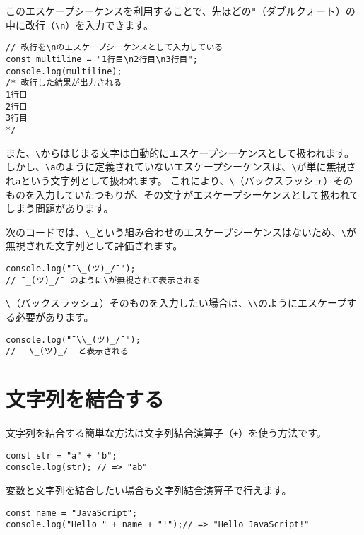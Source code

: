 このエスケープシーケンスを利用することで、先ほどの\texttt{"}（ダブルクォート）の中に改行（\texttt{\textbackslash n}）を入力できます。

\begin{lstlisting}
// 改行を\nのエスケープシーケンスとして入力している
const multiline = "1行目\n2行目\n3行目";
console.log(multiline); 
/* 改行した結果が出力される
1行目
2行目
3行目
*/
\end{lstlisting}

また、\texttt{\textbackslash}からはじまる文字は自動的にエスケープシーケンスとして扱われます。
しかし、\texttt{\textbackslash a}のように定義されていないエスケープシーケンスは、\texttt{\textbackslash}が単に無視され\texttt{a}という文字列として扱われます。
これにより、\texttt{\textbackslash}（バックスラッシュ）そのものを入力していたつもりが、その文字がエスケープシーケンスとして扱われてしまう問題があります。

次のコードでは、\texttt{\textbackslash\_}という組み合わせのエスケープシーケンスはないため、\texttt{\textbackslash}が無視された文字列として評価されます。

\begin{lstlisting}
console.log("¯\_(ツ)_/¯"); 
// ¯_(ツ)_/¯ のように\が無視されて表示される
\end{lstlisting}

\texttt{\textbackslash}（バックスラッシュ）そのものを入力したい場合は、\texttt{\textbackslash\textbackslash}のようにエスケープする必要があります。

\begin{lstlisting}
console.log("¯\\_(ツ)_/¯"); 
//　¯\_(ツ)_/¯ と表示される
\end{lstlisting}

\hypertarget{concat}{%
\section{文字列を結合する}\label{concat}}

文字列を結合する簡単な方法は文字列結合演算子（\texttt{+}）を使う方法です。

\begin{lstlisting}
const str = "a" + "b";
console.log(str); // => "ab"
\end{lstlisting}

変数と文字列を結合したい場合も文字列結合演算子で行えます。

\begin{lstlisting}
const name = "JavaScript";
console.log("Hello " + name + "!");// => "Hello JavaScript!"
\end{lstlisting}


